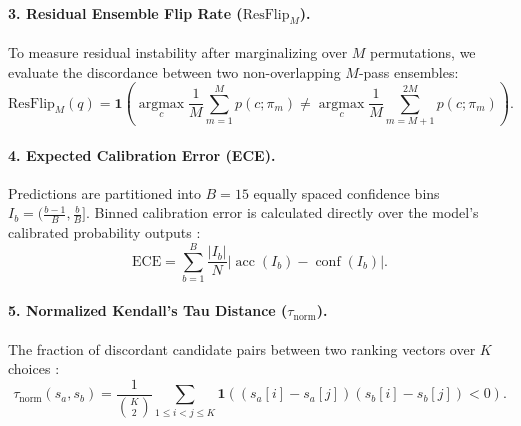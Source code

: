 \documentclass[10pt]{article}
\begin{document}
\paragraph{3. Residual Ensemble Flip Rate ($\mathrm{ResFlip}_M$).}
To measure residual instability after marginalizing over $M$ permutations, we evaluate the discordance between two non-overlapping $M$-pass ensembles:
\begin{equation}
\mathrm{ResFlip}_M(q) = \mathbf{1}\left( \operatorname*{argmax}_{c} \frac{1}{M}\sum_{m=1}^M p(c; \pi_m) \neq \operatorname*{argmax}_{c} \frac{1}{M}\sum_{m=M+1}^{2M} p(c; \pi_m) \right).
\end{equation}

\paragraph{4. Expected Calibration Error (ECE).}
Predictions are partitioned into $B=15$ equally spaced confidence bins $I_b = (\frac{b-1}{B}, \frac{b}{B}]$. Binned calibration error is calculated directly over the model's calibrated probability outputs \citep{guo2017calibration, naeini2015obtaining, nixon2019measuring}:
\begin{equation}
\mathrm{ECE} = \sum_{b=1}^B \frac{|I_b|}{N} \left| \operatorname{acc}(I_b) - \operatorname{conf}(I_b) \right|.
\end{equation}

\paragraph{5. Normalized Kendall's Tau Distance ($\tau_{\mathrm{norm}}$).}
The fraction of discordant candidate pairs between two ranking vectors over $K$ choices \citep{kendall1938new}:
\begin{equation}
\tau_{\mathrm{norm}}(s_a, s_b) = \frac{1}{\binom{K}{2}} \sum_{1 \le i < j \le K} \mathbf{1}\left( (s_a[i] - s_a[j])(s_b[i] - s_b[j]) < 0 \right).
\end{equation}
\end{document}
